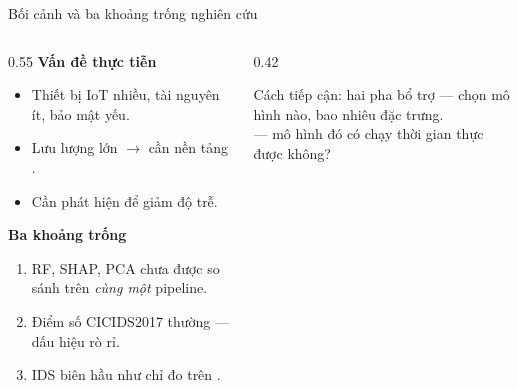 \documentclass[aspectratio=169, 11pt]{beamer}
\begin{document}
\begin{frame}{Bối cảnh và ba khoảng trống nghiên cứu}
  \begin{columns}[T]
    \begin{column}{0.55\textwidth}
      \textbf{Vấn đề thực tiễn}
      \begin{itemize}\small
        \item Thiết bị IoT nhiều, tài nguyên ít, bảo mật yếu.
        \item Lưu lượng lớn $\rightarrow$ cần nền tảng .
        \item Cần phát hiện  để giảm độ trễ.
      \end{itemize}
      \vspace{0.5em}
      \textbf{Ba khoảng trống}
      \begin{enumerate}\small
        \item RF, SHAP, PCA chưa được so sánh trên \emph{cùng một} pipeline.
        \item Điểm số CICIDS2017 thường  --- dấu hiệu rò rỉ.
        \item IDS biên hầu như chỉ đo trên .
      \end{enumerate}
    \end{column}
    \begin{column}{0.42\textwidth}
      \begin{exampleblock}{Cách tiếp cận: hai pha bổ trợ}
         --- chọn mô hình nào, bao nhiêu đặc trưng.\\[0.5em]
         --- mô hình đó có chạy thời gian thực được không?
      \end{exampleblock}
    \end{column}
  \end{columns}
\end{frame}
\end{document}
